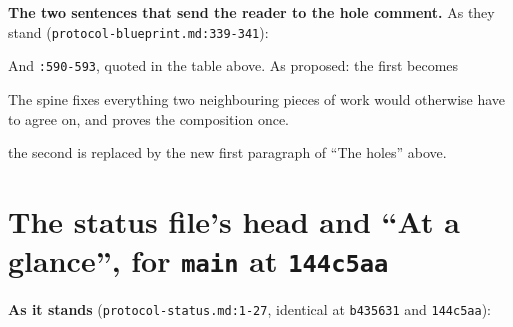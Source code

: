 \textbf{The two sentences that send the reader to the hole comment.} As they stand (\texttt{protocol-\allowbreak{}blueprint.\allowbreak{}md:\allowbreak{}339-\allowbreak{}341}):


And \texttt{:\allowbreak{}590-\allowbreak{}593}, quoted in the table above. As proposed: the first becomes

\begin{srccode}
The spine fixes everything two neighbouring pieces of work would otherwise have to agree on, and proves the composition once.
\end{srccode}

the second is replaced by the new first paragraph of ``The holes'' above.

\section{The status file's head and ``At a glance'', for \texttt{main} at \texttt{144c5aa}}\label{sec:docs-text-status}

\textbf{As it stands} (\texttt{protocol-\allowbreak{}status.\allowbreak{}md:\allowbreak{}1-\allowbreak{}27}, identical at \texttt{b435631} and \texttt{144c5aa}):

